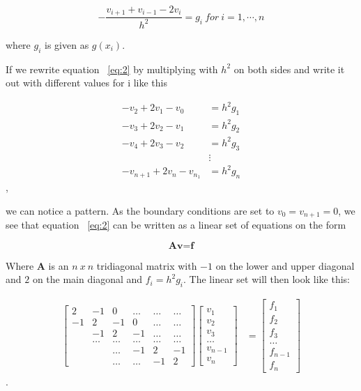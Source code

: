 \documentclass[a4paper,norsk,12pt,oneside]{article}
\begin{document}
\begin{equation}\label{eq:2}
    -\frac{v_{i+1} + v_{i-1} - 2v_i}{h^2} = g_i \ for \ i = 1, \cdots, n
\end{equation}

where \(g_i\) is given as \(g(x_i)\).

If we rewrite equation ~\ref{eq:2} by multiplying with \(h^2\) on both sides
and write it out with different values for i like this

\begin{align*}
    -v_2 + 2v_1 - v_0 &= h^2g_1\\
    -v_3 + 2v_2 - v_1 &= h^2g_2\\
    -v_4 + 2v_3 - v_2 &= h^2g_3\\
    &\vdots \\
    -v_{n+1} + 2v_n - v_{n_1} &= h^2g_{n}
\end{align*}, 

we can notice a pattern. As the boundary conditions are set to \(v_0 = v_{n+1} = 0\), we see that
equation ~\ref{eq:2} can be written as a linear set of equations on the form

\begin{equation*}
    \textbf{A} \textbf{v} = \textbf{f}
\end{equation*} 

Where \(\textbf{A}\) is an \(n \ x \ n\) tridiagonal matrix with \(-1\) on the lower and 
upper diagonal and \(2\) on the main diagonal and \(f_i = h^2 g_i\). The linear set will
then look like this:

\begin{align}
	\label{matrix_A}	
	\begin{bmatrix}
		2 & -1 & 0 & \hdots & \hdots & \hdots \\
		-1 & 2 & -1 & 0 & \hdots & \hdots \\
		& -1 & 2 & -1 & \hdots & \hdots \\
		& \hdots & \hdots & \hdots & \hdots & \hdots \\ 
		&& \hdots & -1 & 2 & -1 \\
		&& \hdots & \hdots & -1 & 2 
	\end{bmatrix} \begin{bmatrix}
	v_1 \\ v_2 \\ v_3 \\ \hdots \\ v_{n-1} \\ v_n
	\end{bmatrix} &= \begin{bmatrix}
	f_1 \\ f_2 \\ f_3 \\ \hdots \\ f_{n-1} \\ f_n
	\end{bmatrix}
\end{align}.  
\end{document}
